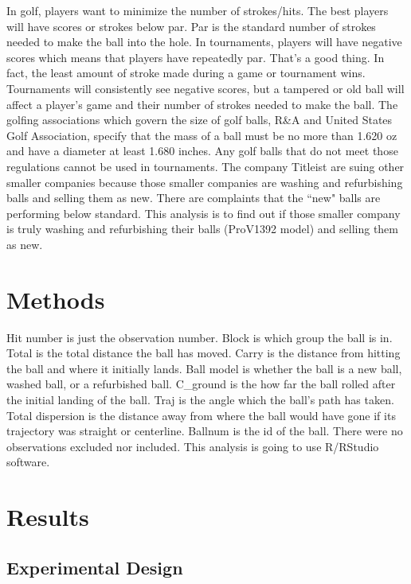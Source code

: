 \documentclass{article}\usepackage[]{graphicx}\usepackage[]{color}
\begin{document}
In golf, players want to minimize the number of strokes/hits. The best players will have scores or strokes below par. Par is the standard number of strokes needed to make the ball into the hole. In tournaments, players will have negative scores which means that players have repeatedly par. That’s a good thing. In fact, the least amount of stroke made during a game or tournament wins. Tournaments will consistently see negative scores, but a tampered or old ball will affect a player’s game and their number of strokes needed to make the ball.   
The golfing associations which govern the size of golf balls, R\&A and United States Golf Association, specify that the mass of a ball must be no more than 1.620 oz and have a diameter at least 1.680 inches. Any golf balls that do not meet those regulations cannot be used in tournaments. The company Titleist are suing other smaller companies because those smaller companies are washing and refurbishing balls and selling them as new. There are complaints that the ``new" balls are performing below standard. This analysis is to find out if those smaller company is truly washing and refurbishing their balls (ProV1392 model) and selling them as new. 

\section*{Methods}

Hit number is just the observation number. Block is which group the ball is in. Total is the total distance the ball has moved. Carry is the distance from hitting the ball and where it initially lands. Ball model is whether the ball is a new ball, washed ball, or a refurbished ball. C\_ground is the how far the ball rolled after the initial landing of the ball. Traj is the angle which the ball's path has taken. Total dispersion is the distance away from where the ball would have gone if its trajectory was straight or centerline. Ballnum is the id of the ball. 
There were no observations excluded nor included. This analysis is going to use R/RStudio software.

\section*{Results}
\subsection*{Experimental Design}
\end{document}
